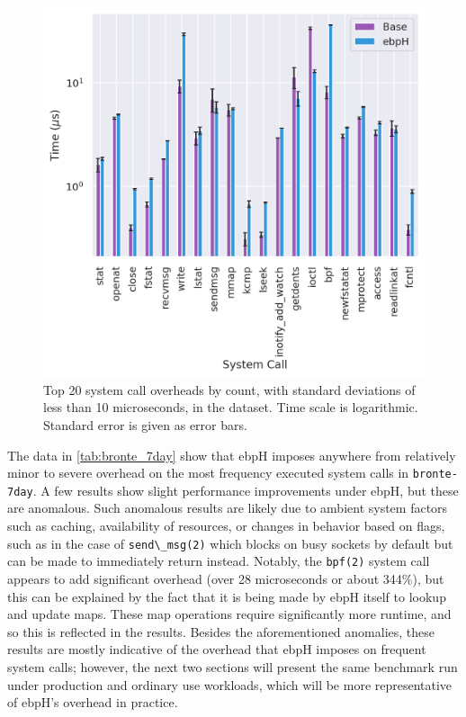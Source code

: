 \documentclass[
  12pt]{findlay}
\newcommand{\passthrough}[1]{#1}
\begin{document}
\begin{figure}
    \caption[Top 20 system call overheads by count in the  dataset]{
        Top 20 system call overheads by count, with standard deviations of less than 10 microseconds,
        in the  dataset. Time scale is logarithmic. Standard error is given as error bars.
    }
    \label{fig:bronte_7day}
    \includegraphics[width=.8\textwidth]{../data/bench/bronte-7day/bronte_7day_times.png}
\end{figure}

The data in \autoref{tab:bronte_7day} show that ebpH imposes anywhere
from relatively minor to severe overhead on the most frequency executed
system calls in \passthrough{\lstinline!bronte-7day!}. A few results
show slight performance improvements under ebpH, but these are
anomalous. Such anomalous results are likely due to ambient system
factors such as caching, availability of resources, or changes in
behavior based on flags, such as in the case of
\passthrough{\lstinline!send\_msg(2)!} which blocks on busy sockets by
default but can be made to immediately return instead. Notably, the
\passthrough{\lstinline!bpf(2)!} system call appears to add significant
overhead (over 28 microseconds or about 344\%), but this can be
explained by the fact that it is being made by ebpH itself to lookup and
update maps. These map operations require significantly more runtime,
and so this is reflected in the results. Besides the aforementioned
anomalies, these results are mostly indicative of the overhead that ebpH
imposes on frequent system calls; however, the next two sections will
present the same benchmark run under production and ordinary use
workloads, which will be more representative of ebpH's overhead in
practice.
\end{document}
